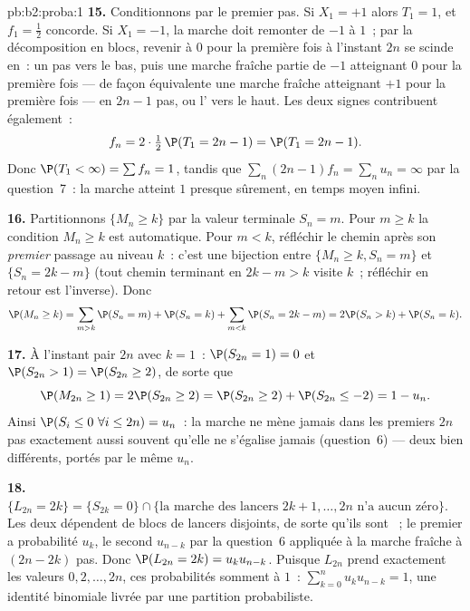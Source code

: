 \begin{solution}{pb:b2:proba:1}
\textbf{15.} Conditionnons par le premier pas. Si $X_1 = +1$ alors
$T_1 = 1$, et $f_1 = \frac12$ concorde. Si $X_1 = -1$, la
marche doit remonter de $-1$ à $1$~; par la décomposition en blocs,
revenir à $0$ pour la première fois à l'instant $2n$ se scinde en~:
un pas vers le bas, puis une marche fraîche partie de $-1$ atteignant
$0$ pour la première fois --- de façon équivalente une marche fraîche atteignant
$+1$ pour la première fois --- en $2n - 1$ pas, ou l'  vers le haut.
Les deux signes contribuent également~:
\[
f_n = 2\cdot\tfrac12\,\P(T_1 = 2n - 1) = \P(T_1 = 2n-1) .
\]
Donc $\P(T_1 < \infty) = \sum f_n = 1$, tandis que $\sum_n(2n -
1)f_n = \sum_n u_n = \infty$ par la question~7~: la marche atteint
$1$ presque sûrement, en temps moyen infini.

\textbf{16.} Partitionnons $\{M_n \geq k\}$ par la valeur terminale
$S_n = m$. Pour $m \geq k$ la condition $M_n \geq k$ est
automatique. Pour $m < k$, réfléchir le chemin après son
\emph{premier} passage au niveau $k$~: c'est une bijection entre
$\{M_n \geq k, S_n = m\}$ et $\{S_n = 2k - m\}$ (tout chemin
terminant en $2k - m > k$ visite $k$~; réfléchir en retour est
l'inverse). Donc
\[
\P(M_n \geq k)
= \sum_{m > k}\P(S_n = m) + \P(S_n = k)
+ \sum_{m < k}\P(S_n = 2k - m)
= 2\P(S_n > k) + \P(S_n = k).
\]

\textbf{17.} À l'instant pair $2n$ avec $k = 1$~: $\P(S_{2n} = 1)
= 0$ et $\P(S_{2n} > 1) = \P(S_{2n} \geq 2)$, de sorte que
\[
\P(M_{2n} \geq 1) = 2\P(S_{2n} \geq 2)
= \P(S_{2n} \geq 2) + \P(S_{2n} \leq -2)
= 1 - u_n .
\]
Ainsi $\P(S_i \leq 0\ \forall i \leq 2n) = u_n$~: la marche
ne mène jamais dans les premiers $2n$ pas exactement aussi souvent qu'elle
ne s'égalise jamais (question~6) --- deux  bien différents,
portés par le même $u_n$.

\textbf{18.} $\{L_{2n} = 2k\} = \{S_{2k} = 0\} \cap
\{\text{la marche des lancers } 2k+1, \dots, 2n \text{ n'a
aucun zéro}\}$. Les deux  dépendent de blocs de lancers disjoints,
de sorte qu'ils sont ~; le premier a probabilité $u_k$, le
second $u_{n-k}$ par la question~6 appliquée à la marche fraîche à
$(2n-2k)$ pas. Donc $\P(L_{2n} = 2k) = u_ku_{n-k}$.
Puisque $L_{2n}$ prend exactement les valeurs $0, 2, \dots, 2n$,
ces probabilités somment à $1$~:
$\sum_{k=0}^nu_ku_{n-k} = 1$, une identité binomiale livrée
par une partition probabiliste.


\end{solution}
